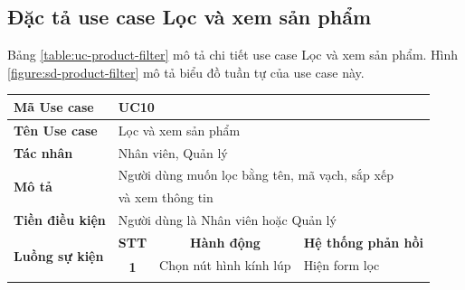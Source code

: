 \documentclass[../DoAn.tex]{subfiles}
\begin{document}
\subsection{Đặc tả use case Lọc và xem sản phẩm}
\label{section:uc-product-filter}
Bảng \ref{table:uc-product-filter} mô tả chi tiết use case Lọc và xem sản phẩm. Hình \ref{figure:sd-product-filter} mô tả biểu đồ tuần tự của use case này.
\begin{table}[H]
    \begin{tabular}{|l|c|l|l|}
        \hline
        \textbf{Mã Use case}                    & \multicolumn{3}{l|}{UC10}                                                                                                                                       \\ \hline
        \textbf{Tên Use case}                   & \multicolumn{3}{l|}{Lọc và xem sản phẩm}                                                                                                                        \\ \hline
        \textbf{Tác nhân}                       & \multicolumn{3}{l|}{Nhân viên, Quản lý}                                                                                                                         \\ \hline
        \multirow{2}{*}{\textbf{Mô tả} }        & \multicolumn{3}{l|}{Người dùng muốn lọc bằng tên, mã vạch, sắp xếp}                                                                                             \\
                                                & \multicolumn{3}{l|}{và xem thông tin}                                                                                                                           \\ \hline
        \textbf{Tiền điều kiện}                 & \multicolumn{3}{l|}{Người dùng là Nhân viên hoặc Quản lý}                                                                                                       \\ \hline
        \multirow{7}{*}{\textbf{Luồng sự kiện}} & \multicolumn{1}{c|}{\textbf{STT}}                                   & \multicolumn{1}{c|}{\textbf{Hành động}} & \multicolumn{1}{c|}{\textbf{Hệ thống phản hồi}} \\ \cline{2-4}
                                                & \multirow{6}{*}{\textbf{1}}                                         & Chọn nút hình kính lúp                  & Hiện form lọc                                   \\ \cline{3-4}

\end{tabular}
\end{table}
\end{document}
